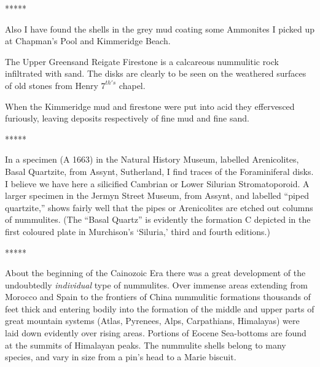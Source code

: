 \documentclass[a4paper, 12pt, oneside]{article}
\begin{document}
\centerline{*\hspace{15mm}*\hspace{15mm}*\hspace{15mm}*\hspace{15mm}*}
\bigskip

Also I have found the shells in the grey mud coating some Ammonites I picked up at Chapman's Pool and Kimmeridge Beach.

The Upper Greensand Reigate Firestone is a calcareous nummulitic rock infiltrated with sand. The disks are clearly to be seen on the weathered surfaces of old stones from Henry $7^{th's}$ chapel.

When the Kimmeridge mud and firestone were put into acid they effervesced furiously, leaving deposits respectively of fine mud and fine sand.

\centerline{*\hspace{15mm}*\hspace{15mm}*\hspace{15mm}*\hspace{15mm}*}
\bigskip

In a specimen (A 1663) in the Natural History Museum, labelled Arenicolites, Basal Quartzite, from Assynt, Sutherland, I find traces of the Foraminiferal disks. I believe we have here a silicified Cambrian or Lower Silurian Stromatoporoid. A larger specimen in the Jermyn Street Museum, from Assynt, and labelled ``piped quartzite,'' shows fairly well that the pipes or Arenicolites are etched out columns of nummulites. (The ``Basal Quartz'' is evidently the formation C depicted in the first coloured plate in Murchison's `Siluria,' third and fourth editions.)

\centerline{*\hspace{15mm}*\hspace{15mm}*\hspace{15mm}*\hspace{15mm}*}
\bigskip

About the beginning of the Cainozoic Era there was a great development of the undoubtedly \emph{individual} type of nummulites. Over immense areas extending from Morocco and Spain to the frontiers of China nummulitic formations thousands of feet thick and entering bodily into the formation of the middle and upper parts of great mountain systems (Atlas, Pyrenees, Alps, Carpathians, Himalayas) were laid down evidently over rising areas. Portions of Eocene Sea-bottoms are found at the summits of Himalayan peaks. The nummulite shells belong to many species, and vary in size from a pin's head to a Marie biscuit.
\end{document}
